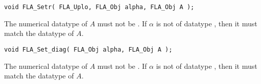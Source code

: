 
\begin{flaspec}
\begin{verbatim}
void FLA_Setr( FLA_Uplo, FLA_Obj alpha, FLA_Obj A );
\end{verbatim}
\begin{checks}
\checkitem
The numerical datatype of $ A $ must not be \flaconstantns.
\itemvsp
\checkitem
If $ \alpha $ is not of datatype \flaconstantns, then it must
match the datatype of $ A $.
\end{checks}
\begin{params}
\end{params}
\end{flaspec}


\begin{flaspec}
\begin{verbatim}
void FLA_Set_diag( FLA_Obj alpha, FLA_Obj A );
\end{verbatim}
\begin{checks}
\checkitem
The numerical datatype of $ A $ must not be \flaconstantns.
\itemvsp
\checkitem
If $ \alpha $ is not of datatype \flaconstantns, then it must
match the datatype of $ A $.
\end{checks}
\begin{params}
\end{params}
\end{flaspec}


